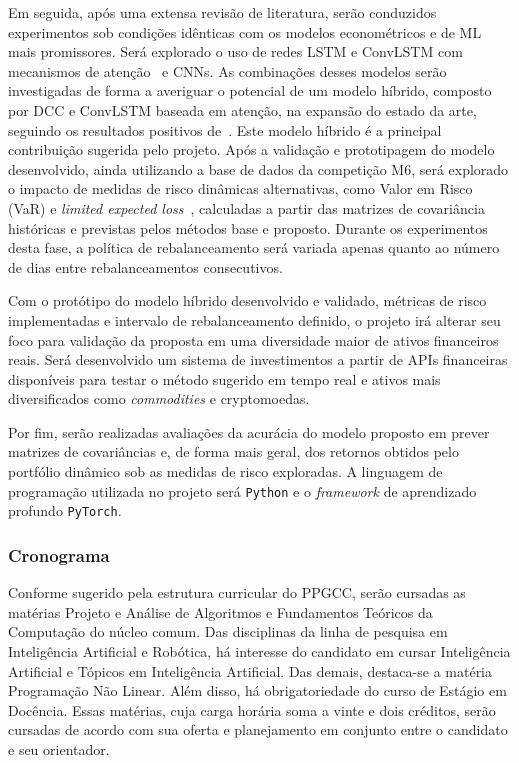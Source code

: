 \documentclass[a4paper, 12pt]{article}
\begin{document}
\begin{spacing}{.9}
Em seguida, após uma extensa revisão de literatura, serão conduzidos
experimentos sob condições idênticas com os modelos econométricos e de ML mais
promissores. Será explorado o uso de redes LSTM e ConvLSTM com mecanismos de
atenção~\cite{attention} e CNNs. As combinações desses modelos serão
investigadas de forma a averiguar o potencial de um modelo híbrido, composto
por DCC e ConvLSTM baseada em atenção, na expansão do estado da arte, seguindo
os resultados positivos de~\cite{dl_multi}. Este modelo híbrido é a principal
contribuição sugerida pelo projeto. Após a validação e prototipagem do modelo
desenvolvido, ainda utilizando a base de dados da competição M6, será explorado
o impacto de medidas de risco dinâmicas alternativas, como Valor em Risco (VaR)
e \emph{limited expected loss}~\cite{gambrah2014risk}, calculadas a partir das
matrizes de covariância históricas e previstas pelos métodos base e proposto.
Durante os experimentos desta fase, a política de rebalanceamento será variada
apenas quanto ao número de dias entre rebalanceamentos consecutivos.

Com o protótipo do modelo híbrido desenvolvido e validado, métricas de risco
implementadas e intervalo de rebalanceamento definido, o projeto irá alterar seu
foco para validação da proposta em uma diversidade maior de ativos financeiros
reais. Será desenvolvido um sistema de investimentos a partir de APIs
financeiras disponíveis para testar o método sugerido em tempo real e ativos
mais diversificados como \emph{commodities} e cryptomoedas.

Por fim, serão realizadas avaliações da acurácia do modelo proposto em prever
matrizes de covariâncias e, de forma mais geral, dos retornos obtidos pelo
portfólio dinâmico sob as medidas de risco exploradas. A linguagem de
programação utilizada no projeto será \verb+Python+ e o \emph{framework} de
aprendizado profundo \verb+PyTorch+.

\subsubsection*{Cronograma}

Conforme sugerido pela estrutura curricular do PPGCC, serão cursadas as
matérias Projeto e Análise de Algoritmos e Fundamentos Teóricos da Computação
do núcleo comum. Das disciplinas da linha de pesquisa em Inteligência
Artificial e Robótica, há interesse do candidato em cursar Inteligência
Artificial e Tópicos em Inteligência Artificial. Das demais, destaca-se a
matéria Programação Não Linear. Além disso, há obrigatoriedade do curso de Estágio
em Docência. Essas matérias, cuja carga horária soma a vinte e dois créditos,
serão cursadas de acordo com sua oferta e planejamento em conjunto entre o
candidato e seu orientador.


\end{spacing}
\end{document}
